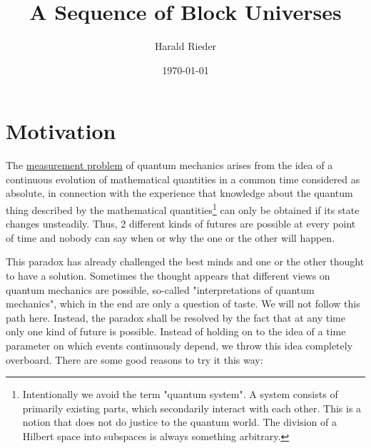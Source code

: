 \documentclass[12pt]{article}
\begin{document}
\title{\fontsize{25}{25}\selectfont \textbf{A Sequence of Block Universes}}
\author{Harald Rieder}
\date{\today}
\maketitle



\tableofcontents

\section{Motivation}

The \href{https://en.wikipedia.org/wiki/Measurement_problem}{measurement problem} of quantum mechanics arises from the idea of a continuous evolution of mathematical quantities in a common time considered as absolute, in connection with the experience that knowledge about the quantum thing described by the mathematical quantities\footnote{Intentionally we avoid the term "quantum system". A system consists of primarily existing parts, which secondarily interact with each other. This is a notion that does not do justice to the quantum world. The division of a Hilbert space into subspaces is always something arbitrary.} can only be obtained if its state changes unsteadily. Thus, 2 different kinds of futures are possible at every point of time and nobody can say when or why the one or the other will happen.

This paradox has already challenged the best minds and one or the other thought to have a solution. Sometimes the thought appears that different views on quantum mechanics are possible, so-called "interpretations of quantum mechanics", which in the end are only a question of taste. We will not follow this path here. Instead, the paradox shall be resolved by the fact that at any time only one kind of future is possible. Instead of holding on to the idea of a time parameter on which events continuously depend, we throw this idea completely overboard. There are some good reasons to try it this way:
\end{document}
